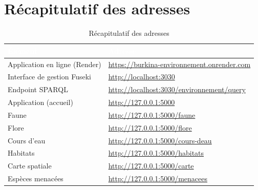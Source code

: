 ﻿\documentclass[12pt,a4paper]{report}
\newcommand{\tete}[1]{\cellcolor{bleu}\textcolor{white}{\bfseries #1}}
\begin{document}
\section{Récapitulatif des adresses}

\begin{table}[H]
\centering
\caption{Récapitulatif des adresses}
\begin{tabular}{@{}p{5.8cm}p{9.0cm}@{}}
\hline
\tete{Élément} & \tete{Adresse} \\
\hline
\rowcolor{grisfond} Application en ligne (Render) & \url{https://burkina-environnement.onrender.com} \\
\rowcolor{grisfond} Interface de gestion Fuseki & \url{http://localhost:3030} \\
\rowcolor{grisfond} Endpoint SPARQL & \url{http://localhost:3030/environnement/query} \\
\rowcolor{grisfond} Application (accueil) & \url{http://127.0.0.1:5000} \\
\rowcolor{grisfond} Faune & \url{http://127.0.0.1:5000/faune} \\
\rowcolor{grisfond} Flore & \url{http://127.0.0.1:5000/flore} \\
\rowcolor{grisfond} Cours d'eau & \url{http://127.0.0.1:5000/cours-deau} \\
\rowcolor{grisfond} Habitats & \url{http://127.0.0.1:5000/habitats} \\
\rowcolor{grisfond} Carte spatiale & \url{http://127.0.0.1:5000/carte} \\
\rowcolor{grisfond} Espèces menacées & \url{http://127.0.0.1:5000/menacees} \\
\hline
\end{tabular}
\end{table}
\end{document}
